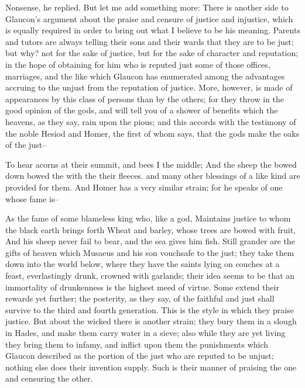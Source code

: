 Nonsense, he replied. But let me add something more: There is another side to Glaucon's argument about the praise and censure of justice and injustice, which is equally required in order to bring out what I believe to be his meaning. Parents and tutors are always telling their sons and their wards that they are to be just; but why? not for the sake of justice, but for the sake of character and reputation; in the hope of obtaining for him who is reputed just some of those offices, marriages, and the like which Glaucon has enumerated among the advantages accruing to the unjust from the reputation of justice. More, however, is made of appearances by this class of persons than by the others; for they throw in the good opinion of the gods, and will tell you of a shower of benefits which the heavens, as they say, rain upon the pious; and this accords with the testimony of the noble Hesiod and Homer, the first of whom says, that the gods make the oaks of the just--

To hear acorns at their summit, and bees I the middle;
And the sheep the bowed down bowed the with the their fleeces. and many other blessings of a like kind are provided for them. And Homer has a very similar strain; for he speaks of one whose fame is--

As the fame of some blameless king who, like a god,
Maintains justice to whom the black earth brings forth
Wheat and barley, whose trees are bowed with fruit,
And his sheep never fail to bear, and the sea gives him fish. Still grander are the gifts of heaven which Musaeus and his son vouchsafe to the just; they take them down into the world below, where they have the saints lying on couches at a feast, everlastingly drunk, crowned with garlands; their idea seems to be that an immortality of drunkenness is the highest meed of virtue. Some extend their rewards yet further; the posterity, as they say, of the faithful and just shall survive to the third and fourth generation. This is the style in which they praise justice. But about the wicked there is another strain; they bury them in a slough in Hades, and make them carry water in a sieve; also while they are yet living they bring them to infamy, and inflict upon them the punishments which Glaucon described as the portion of the just who are reputed to be unjust; nothing else does their invention supply. Such is their manner of praising the one and censuring the other.

